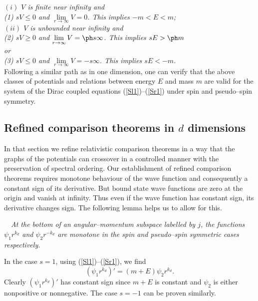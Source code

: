 \documentclass[amsmath,amssymb,superscriptaddress,showkeys, showpacs, aps, nofootinbib]{revtex4}
\begin{document}
{\it $(i)$ $V$ is finite near infinity and\\

\hspace{3cm} (1) $sV\le 0$ and $\lim\limits_{r\to\infty}V=0$. This implies $-m<E<m$;\\

$(ii)$ $V$ is unbounded near infinity and\\

\hspace{3cm} (2) $sV\ge 0$ and $\lim\limits_{r\to\infty}V=\ph s\infty$. This implies $sE>\ph m$\\

or\\

\hspace{3cm} (3) $sV\le 0$ and $\lim\limits_{r\to\infty}V=-s\infty$. This implies $sE<-m$.}\\

Following a similar path as in one dimension, one can verify that the above classes of potentials and relations between energy $E$ and mass $m$ are valid for the system of the Dirac coupled equations (\ref{Sl1})--(\ref{Sr1}) under spin and pseudo--spin symmetry. 

\subsection{Refined comparison theorems in $d$ dimensions}
In that section we refine relativistic comparison theorems in a way that the graphs of the potentials can crossover in a controlled manner with the preservation of spectral ordering. Our establishment of refined comparison theorems requires monotone behaviour of the wave function and consequently a constant sign of its derivative. But bound state wave functions are zero at the origin and vanish at infinity. Thus even if the wave function has constant sign, its derivative changes sign. The following lemma helps us to allow for this.

\medskip

 ~~{\it At the bottom of an angular--momentum subspace labelled by $j$, the functions $\psi_1 r^{k_d}$ and $\psi_2 r^{-k_d}$ are monotone in the spin and pseudo--spin symmetric cases respectively.} 

\medskip

 In the case $s=1$, using (\ref{Sl1})--(\ref{Sr1}), we find
\begin{equation*}
\left(\psi_1 r^{k_d}\right)'=(m+E)\psi_2r^{k_d}.
\end{equation*}
Clearly $\left(\psi_1 r^{k_d}\right)'$ has constant sign since $m+E$ is constant and $\psi_2$ is either nonpositive or nonnegative. The case $s=-1$ can be proven similarly.
\end{document}
